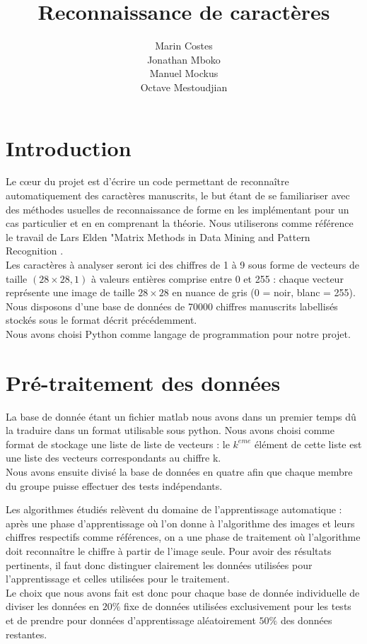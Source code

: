 \documentclass[a4paper,11pt,twoside]{report}
\author{Marin Costes\\Jonathan Mboko\\Manuel Mockus\\Octave Mestoudjian}
\title{Reconnaissance de caractères}
\begin{document}
 
\maketitle 

\tableofcontents
\chapter{Introduction}
Le cœur du projet est d'écrire un code permettant de reconnaître automatiquement des caractères manuscrits, le but étant de se familiariser avec des méthodes usuelles de reconnaissance de forme en les implémentant pour un cas particulier et en en comprenant la théorie. 
Nous utiliserons comme référence le travail de Lars Elden "Matrix Methods in Data Mining and Pattern Recognition  \cite{Elden}. \\

Les caractères à analyser seront ici des chiffres de 1 à 9 sous forme de vecteurs de taille $(28\times28,1)$ à valeurs entières comprise entre 0 et 255 : chaque vecteur représente une image de taille $28\times28$ en nuance de gris (0 = noir, blanc = 255). Nous disposons d'une base de données de 70000 chiffres manuscrits labellisés stockés sous le format décrit précédemment.\\


Nous avons choisi Python comme langage de programmation pour notre projet.

\chapter{Pré-traitement des données}
La base de donnée étant un fichier matlab nous avons dans un premier temps dû la traduire dans un format utilisable sous python. Nous avons choisi comme format de stockage une liste de liste de vecteurs : le $k^{eme}$ élément de cette liste est une liste des vecteurs correspondants au chiffre k.\\
Nous avons ensuite divisé la base de données en quatre afin que chaque membre du groupe puisse effectuer des tests indépendants. 

Les algorithmes étudiés relèvent du domaine de l'apprentissage automatique : après une phase d'apprentissage où l'on donne à l'algorithme des images et leurs chiffres respectifs comme références, on a une phase de traitement où l'algorithme doit reconnaître le chiffre à partir de l'image seule. Pour avoir des résultats pertinents, il faut donc distinguer clairement les données utilisées pour l'apprentissage et celles utilisées pour le traitement.\\Le choix que nous avons fait est donc pour chaque base de donnée individuelle de diviser les données en $20\%$ fixe de données utilisées exclusivement pour les tests et de prendre pour données d'apprentissage aléatoirement $50\%$ des données restantes.
\end{document}
